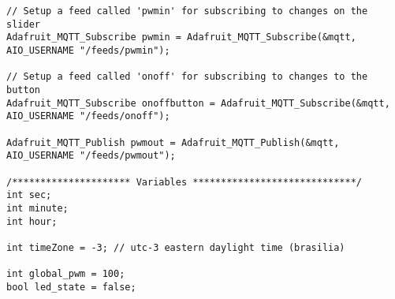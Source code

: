 \begin{lstlisting}
// Setup a feed called 'pwmin' for subscribing to changes on the slider
Adafruit_MQTT_Subscribe pwmin = Adafruit_MQTT_Subscribe(&mqtt, AIO_USERNAME "/feeds/pwmin");

// Setup a feed called 'onoff' for subscribing to changes to the button
Adafruit_MQTT_Subscribe onoffbutton = Adafruit_MQTT_Subscribe(&mqtt, AIO_USERNAME "/feeds/onoff");

Adafruit_MQTT_Publish pwmout = Adafruit_MQTT_Publish(&mqtt, AIO_USERNAME "/feeds/pwmout");

/********************* Variables *****************************/
int sec;
int minute;
int hour;

int timeZone = -3; // utc-3 eastern daylight time (brasilia)

int global_pwm = 100;
bool led_state = false;

\end{lstlisting}